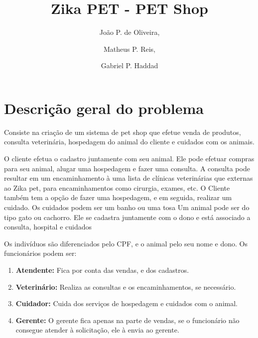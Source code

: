 \documentclass[12pt]{article}
\title{Zika PET - PET Shop}
\author{
	João P. de Oliveira,
    \and
    Matheus P. Reis,
    \and
    Gabriel P. Haddad
}
\begin{document}
  \maketitle               %
  \newpage                 %

\begin{comment}
  \tableofcontents         %
  \newpage                 %
       
  \listoffigures           %
  \newpage 
\end{comment}
 
 \section{Descrição geral do problema}
 Consiste na criação de um sistema de pet shop que efetue venda de produtos, consulta veterinária, hospedagem do animal do cliente e cuidados com os animais.
 
 O cliente efetua o cadastro juntamente com seu animal. Ele pode efetuar compras para seu animal, alugar uma hospedagem e fazer uma consulta. A consulta pode resultar em um encaminhamento à uma lista de clínicas veterinárias que externas ao Zika pet, para encaminhamentos como cirurgia, exames, etc. 
 O Cliente também tem a opção de fazer uma hospedagem, e em seguida, realizar um cuidado. Os cuidados podem ser um banho ou uma tosa 
 Um animal pode ser do tipo gato ou cachorro. Ele se cadastra juntamente com o  dono e está associado a consulta, hospital e cuidados
 
 Os indivíduos são diferenciados pelo CPF, e o animal pelo seu nome e dono. Os funcionários podem ser:
 
\begin{enumerate}
\item \textbf{Atendente:} Fica por conta das vendas, e dos cadastros.

\item \textbf{Veterinário:} Realiza as consultas e os encaminhamentos, se necessário.

\item \textbf{Cuidador:} Cuida dos serviços de hospedagem e cuidados com o animal.

\item \textbf{Gerente:} O gerente fica apenas na parte de vendas, se o funcionário não consegue atender à solicitação, ele à envia ao gerente.
\end{enumerate}
 
\end{document}
